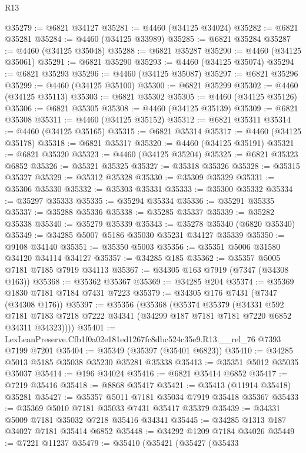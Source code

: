 \begin{lexlean}{R13}
\begin{coremodule}
@35279 := @6821 @34127
@35281 := @4460 (@34125 @34024)
@35282 := @6821 @35281
@35284 := @4460 (@34125 @33989)
@35285 := @6821 @35284
@35287 := @4460 (@34125 @35048)
@35288 := @6821 @35287
@35290 := @4460 (@34125 @35061)
@35291 := @6821 @35290
@35293 := @4460 (@34125 @35074)
@35294 := @6821 @35293
@35296 := @4460 (@34125 @35087)
@35297 := @6821 @35296
@35299 := @4460 (@34125 @35100)
@35300 := @6821 @35299
@35302 := @4460 (@34125 @35113)
@35303 := @6821 @35302
@35305 := @4460 (@34125 @35126)
@35306 := @6821 @35305
@35308 := @4460 (@34125 @35139)
@35309 := @6821 @35308
@35311 := @4460 (@34125 @35152)
@35312 := @6821 @35311
@35314 := @4460 (@34125 @35165)
@35315 := @6821 @35314
@35317 := @4460 (@34125 @35178)
@35318 := @6821 @35317
@35320 := @4460 (@34125 @35191)
@35321 := @6821 @35320
@35323 := @4460 (@34125 @35204)
@35325 := @6821 @35323 @6852
@35326 := @35321 @35325
@35327 := @35318 @35326
@35328 := @35315 @35327
@35329 := @35312 @35328
@35330 := @35309 @35329
@35331 := @35306 @35330
@35332 := @35303 @35331
@35333 := @35300 @35332
@35334 := @35297 @35333
@35335 := @35294 @35334
@35336 := @35291 @35335
@35337 := @35288 @35336
@35338 := @35285 @35337
@35339 := @35282 @35338
@35340 := @35279 @35339
@35343 := @35278 @35340 (@6820 @35340)
@35349 := @34285 @5007 @5186 @35030 @35231 @34127 @35339
@35350 := @9108 @34140
@35351 := @35350 @5003
@35356 := @35351 @5006 @31580 @34120 @34114 @34127
@35357 := @34285 @185
@35362 := @35357 @5005 @7181 @7185 @7919 @34113
@35367 := @34305 @163 @7919 (@7347 (@34308 @163))
@35368 := @35362 @35367
@35369 := @34285 @204
@35374 := @35369 @1830 @7181 @7184 @7431 @7223
@35379 := @34305 @176 @7431 (@7347 (@34308 @176))
@35397 := @35356
    (@35368
      (@35374
        @35379
        (@34331
          @592
          @7181
          @7183
          @7218
          @7222
          @34341
          (@34299 @187 @7181 @7181 @7220 @6852 @34311 @34323))))
@35401 := LexLeanPreserve.Cfb1f0a02e181ed1267fc8dbc524c35e9.R13.__rel_76 @7393 @7199 @7201
@35404 := @35349 (@35397 (@35401 @6823))
@35410 := @34285 @5013 @5185 @35038 @35230 @35281 @35338
@35413 := @35351 @5012 @35035 @35037
@35414 := @196 @34024
@35416 := @6821 @35414 @6852
@35417 := @7219 @35416
@35418 := @8868 @35417
@35421 := @35413 (@11914 @35418) @35281
@35427 := @35357 @5011 @7181 @35034 @7919 @35418 @35367
@35433 := @35369 @5010 @7181 @35033 @7431 @35417 @35379
@35439 := @34331 @5009 @7181 @35032 @7218 @35416 @34341
@35445 := @34285 @1313 @187 @34027 @7181 @35414 @6852
@35448 := @34292 @1209 @7184 @34026
@35449 := @7221 @11237
@35479 := @35410
    (@35421
      (@35427
        (@35433

\end{coremodule}
\end{lexlean}
